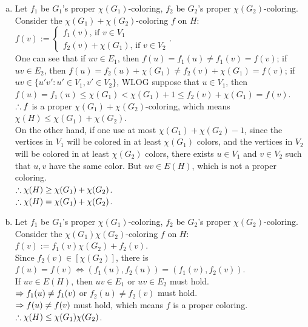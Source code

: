 \setcounter{pr}{2}
\begin{pr}$ $
\begin{enumerate}[(a)]
\item Let $f_1$ be $G_1$'s proper $\chi(G_1)$-coloring, $f_2$ be $G_2$'s proper $\chi(G_2)$-coloring.\\
Consider the $\chi(G_1)+\chi(G_2)$-coloring $f$ on $H$:\\
$f(v):=\begin{cases}
f_1(v)\text{, if }v\in V_1\\
f_2(v)+\chi(G_1)\text{, if }v\in V_2
\end{cases}$.\\
One can see that if $uv\in E_1$, then $f(u)=f_1(u)\neq f_1(v)=f(v)$; if $uv\in E_2$, then $f(u)=f_2(u)+\chi(G_1)\neq f_2(v)+\chi(G_1)=f(v)$; if $uv\in\{u'v': u'\in V_1, v'\in V_2\}$, WLOG suppose that $u\in V_1$, then $f(u)=f_1(u)\leq\chi(G_1)<\chi(G_1)+1\leq f_2(v)+\chi(G_1)=f(v)$.\\
$\therefore f$ is a proper $\chi(G_1)+\chi(G_2)$-coloring, which means $\chi(H)\leq\chi(G_1)+\chi(G_2)$.\\
On the other hand, if one use at most $\chi(G_1)+\chi(G_2)-1$, since the vertices in $V_1$ will be colored in at least $\chi(G_1)$ colors, and the vertices in $V_2$ will be colored in at least $\chi(G_2)$ colors, there exists $u\in V_1$ and $v\in V_2$ such that $u, v$ have the same color. But $uv\in E(H)$, which is not a proper coloring.\\
$\therefore\chi(H)\geq\chi(G_1)+\chi(G_2)$.\\
$\therefore\chi(H)=\chi(G_1)+\chi(G_2)$.
\item Let $f_1$ be $G_1$'s proper $\chi(G_1)$-coloring, $f_2$ be $G_2$'s proper $\chi(G_2)$-coloring.\\
Consider the $\chi(G_1)\chi(G_2)$-coloring $f$ on $H$:\\
$f(v):=f_1(v)\chi(G_2)+f_2(v)$.\\
Since $f_2(v)\in[\chi(G_2)]$, there is $f(u)=f(v)\iff(f_1(u), f_2(u))=(f_1(v), f_2(v))$.\\
If $uv\in E(H)$, then $uv\in E_1$ or $uv\in E_2$ must hold.\\
$\Rightarrow f_1(u)\neq f_1(v)$ or $f_2(u)\neq f_2(v)$ must hold.\\
$\Rightarrow f(u)\neq f(v)$ must hold, which means $f$ is a proper coloring.\\
$\therefore\chi(H)\leq\chi(G_1)\chi(G_2)$.
\end{enumerate}
\end{pr}
